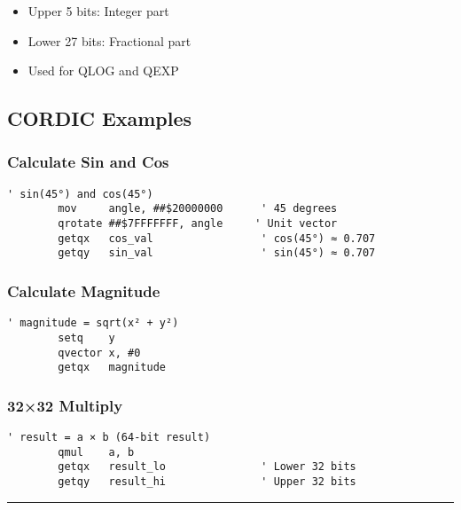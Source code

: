 \documentclass[11pt]{book}
\providecommand{\tightlist}{%
  \setlength{\itemsep}{0pt}\setlength{\parskip}{0pt}}
\begin{document}
\begin{itemize}
\tightlist
\item
  Upper 5 bits: Integer part
\item
  Lower 27 bits: Fractional part
\item
  Used for QLOG and QEXP
\end{itemize}

\hypertarget{cordic-examples}{%
\subsection{CORDIC Examples}\label{cordic-examples}}

\hypertarget{calculate-sin-and-cos}{%
\subsubsection{Calculate Sin and Cos}\label{calculate-sin-and-cos}}

\begin{lstlisting}
' sin(45°) and cos(45°)
        mov     angle, ##$20000000      ' 45 degrees
        qrotate ##$7FFFFFFF, angle     ' Unit vector
        getqx   cos_val                 ' cos(45°) ≈ 0.707
        getqy   sin_val                 ' sin(45°) ≈ 0.707
\end{lstlisting}

\hypertarget{calculate-magnitude}{%
\subsubsection{Calculate Magnitude}\label{calculate-magnitude}}

\begin{lstlisting}
' magnitude = sqrt(x² + y²)
        setq    y
        qvector x, #0
        getqx   magnitude
\end{lstlisting}

\hypertarget{multiply}{%
\subsubsection{32×32 Multiply}\label{multiply}}

\begin{lstlisting}
' result = a × b (64-bit result)
        qmul    a, b
        getqx   result_lo               ' Lower 32 bits
        getqy   result_hi               ' Upper 32 bits
\end{lstlisting}

\begin{center}\rule{0.5\linewidth}{0.5pt}\end{center}
\end{document}
